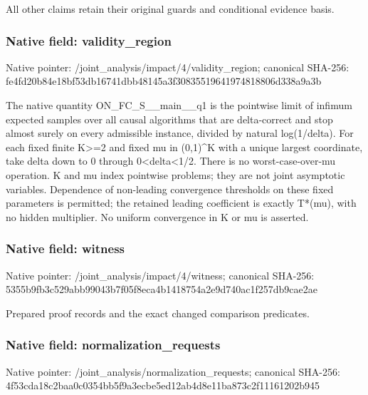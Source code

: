\documentclass[10pt,a4paper]{article}
\begin{document}
\begingroup\raggedright\sloppy All other claims retain their original guards and conditional evidence basis.\par\endgroup

\subsubsection{Native field: validity\_\allowbreak{}region}
Native pointer: /joint\_\allowbreak{}analysis/impact/4/validity\_\allowbreak{}region; canonical SHA-256: fe4fd20b84e18bf53db16741dbb48145a3f30835519641974818806d338a9a3b

\begingroup\raggedright\sloppy The native quantity ON\_\allowbreak{}FC\_\allowbreak{}S\_\allowbreak{}\_\allowbreak{}main\_\allowbreak{}\_\allowbreak{}q1 is the pointwise limit of infimum expected samples over all causal algorithms that are delta-correct and stop almost surely on every admissible instance,\allowbreak{} divided by natural log(1/\allowbreak{}delta). For each fixed finite K>=\allowbreak{}2 and fixed mu in (0,\allowbreak{}1)\textasciicircum{}K with a unique largest coordinate,\allowbreak{} take delta down to 0 through 0<delta<1/\allowbreak{}2. There is no worst-case-over-mu operation. K and mu index pointwise problems;\allowbreak{} they are not joint asymptotic variables. Dependence of non-leading convergence thresholds on these fixed parameters is permitted;\allowbreak{} the retained leading coefficient is exactly T*(mu),\allowbreak{} with no hidden multiplier. No uniform convergence in K or mu is asserted.\par\endgroup

\subsubsection{Native field: witness}
Native pointer: /joint\_\allowbreak{}analysis/impact/4/witness; canonical SHA-256: 5355b9fb3c529abb99043b7f05f8eca4b1418754a2e9d740ac1f257db9cae2ae

\begingroup\raggedright\sloppy Prepared proof records and the exact changed comparison predicates.\par\endgroup

\subsubsection{Native field: normalization\_\allowbreak{}requests}
Native pointer: /joint\_\allowbreak{}analysis/normalization\_\allowbreak{}requests; canonical SHA-256: 4f53cda18c2baa0c0354bb5f9a3ecbe5ed12ab4d8e11ba873c2f11161202b945
\end{document}
